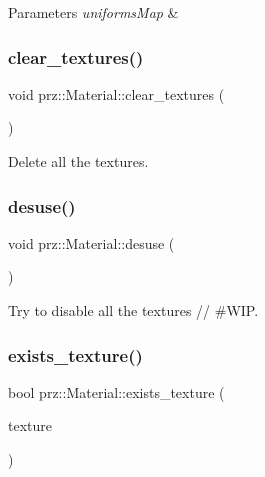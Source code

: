 \begin{DoxyParams}{Parameters}
{\em uniforms\+Map} & \\
\hline
\end{DoxyParams}
\mbox{\label{classprz_1_1_material_aa3c07270df05e4f8048974e20599810d}} 
\subsubsection{\texorpdfstring{clear\_textures()}{clear\_textures()}}
{\footnotesize\ttfamily void prz\+::\+Material\+::clear\+\_\+textures (\begin{DoxyParamCaption}{ }\end{DoxyParamCaption})\hspace{0.3cm}{\ttfamily [inline]}}



Delete all the textures. 

\mbox{\label{classprz_1_1_material_a67f3f1c440c489c784f8beb5b61ff3a0}} 
\subsubsection{\texorpdfstring{desuse()}{desuse()}}
{\footnotesize\ttfamily void prz\+::\+Material\+::desuse (\begin{DoxyParamCaption}{ }\end{DoxyParamCaption})}



Try to disable all the textures // \#\+W\+IP. 

\mbox{\label{classprz_1_1_material_a48029def7213cab037704cf2ca1a485e}} 
\subsubsection{\texorpdfstring{exists\_texture()}{exists\_texture()}}
{\footnotesize\ttfamily bool prz\+::\+Material\+::exists\+\_\+texture (\begin{DoxyParamCaption}\item[{P\+S\+Ptr$<$ \mbox{\hyperlink{classprz_1_1_texture}{Texture}} $>$}]{texture }\end{DoxyParamCaption})}




